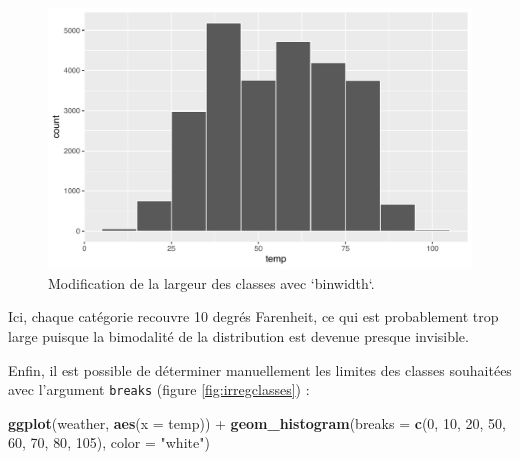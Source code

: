 \documentclass[
  a4paper,
]{article}
\newenvironment{Shaded}{\begin{snugshade}}{\end{snugshade}}
\newcommand{\DataTypeTok}[1]{\textcolor[rgb]{0.00,0.34,0.68}{#1}}
\newcommand{\DecValTok}[1]{\textcolor[rgb]{0.69,0.50,0.00}{#1}}
\newcommand{\KeywordTok}[1]{\textcolor[rgb]{0.12,0.11,0.11}{\textbf{#1}}}
\newcommand{\NormalTok}[1]{\textcolor[rgb]{0.12,0.11,0.11}{#1}}
\newcommand{\OperatorTok}[1]{\textcolor[rgb]{0.12,0.11,0.11}{#1}}
\newcommand{\StringTok}[1]{\textcolor[rgb]{0.75,0.01,0.01}{#1}}
\begin{document}
\begin{figure}[htpb]

{\centering \includegraphics[width=0.9\linewidth]{figure/unnamed-chunk-50-1} 

}

\caption{Modification de la largeur des classes avec `binwidth`.}\label{fig:unnamed-chunk-50}
\end{figure}

Ici, chaque catégorie recouvre 10 degrés Farenheit, ce qui est probablement trop large puisque la bimodalité de la distribution est devenue presque invisible.

Enfin, il est possible de déterminer manuellement les limites des classes souhaitées avec l'argument \texttt{breaks} (figure \ref{fig:irregclasses}) :

\begin{Shaded}
\begin{Highlighting}[]
\KeywordTok{ggplot}\NormalTok{(weather, }\KeywordTok{aes}\NormalTok{(}\DataTypeTok{x =}\NormalTok{ temp)) }\OperatorTok{+}
\StringTok{  }\KeywordTok{geom_histogram}\NormalTok{(}\DataTypeTok{breaks =} \KeywordTok{c}\NormalTok{(}\DecValTok{0}\NormalTok{, }\DecValTok{10}\NormalTok{, }\DecValTok{20}\NormalTok{, }\DecValTok{50}\NormalTok{, }\DecValTok{60}\NormalTok{, }\DecValTok{70}\NormalTok{, }\DecValTok{80}\NormalTok{, }\DecValTok{105}\NormalTok{), }\DataTypeTok{color =} \StringTok{"white"}\NormalTok{)}
\end{Highlighting}
\end{Shaded}
\end{document}
